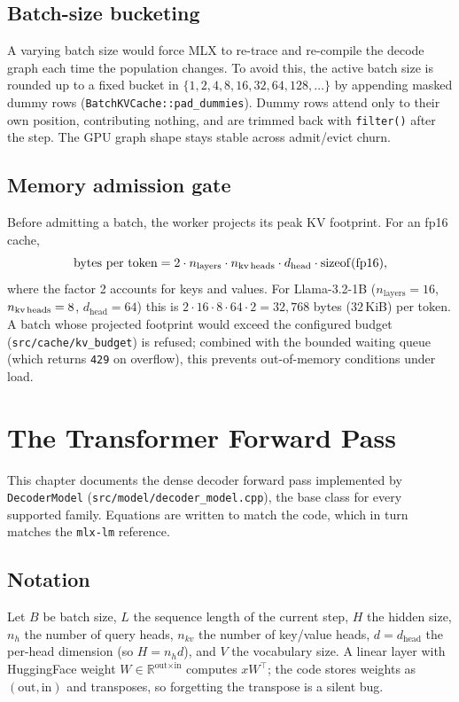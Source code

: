 \documentclass[11pt,a4paper]{report}
\newcommand{\R}{\mathbb{R}}
\newcommand{\code}[1]{\texttt{#1}}
\begin{document}
\section{Batch-size bucketing}
A varying batch size would force MLX to re-trace and re-compile the decode graph
each time the population changes. To avoid this, the active batch size is rounded up
to a fixed bucket in $\{1,2,4,8,16,32,64,128,\dots\}$ by appending masked dummy
rows (\code{BatchKVCache::pad\_dummies}). Dummy rows attend only to their own
position, contributing nothing, and are trimmed back with \code{filter()} after the
step. The GPU graph shape stays stable across admit/evict churn.

\section{Memory admission gate}
Before admitting a batch, the worker projects its peak KV footprint. For an fp16
cache,
\begin{equation}
  \text{bytes per token} = 2 \cdot n_{\text{layers}} \cdot n_{\text{kv\,heads}}
  \cdot d_{\text{head}} \cdot \mathrm{sizeof}(\text{fp16}),
\end{equation}
where the factor 2 accounts for keys and values. For Llama-3.2-1B
($n_{\text{layers}}=16$, $n_{\text{kv\,heads}}=8$, $d_{\text{head}}=64$) this is
$2\cdot16\cdot8\cdot64\cdot2 = 32{,}768$ bytes ($32$\,KiB) per token. A batch whose
projected footprint would exceed the configured budget
(\code{src/cache/kv\_budget}) is refused; combined with the bounded waiting queue
(which returns \code{429} on overflow), this prevents out-of-memory conditions
under load.

\chapter{The Transformer Forward Pass}
\label{ch:forward}

This chapter documents the dense decoder forward pass implemented by
\code{DecoderModel} (\code{src/model/decoder\_model.cpp}), the base class for every
supported family. Equations are written to match the code, which in turn matches
the \code{mlx-lm} reference.

\section{Notation}
Let $B$ be batch size, $L$ the sequence length of the current step, $H$ the hidden
size, $n_h$ the number of query heads, $n_{kv}$ the number of key/value heads,
$d=d_{\text{head}}$ the per-head dimension (so $H = n_h d$), and $V$ the vocabulary
size. A linear layer with HuggingFace weight $W \in \R^{\text{out}\times\text{in}}$
computes $xW^\top$; the code stores weights as $(\text{out},\text{in})$ and
transposes, so forgetting the transpose is a silent bug.
\end{document}
